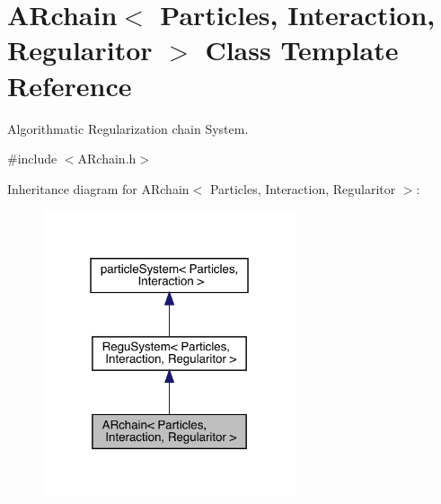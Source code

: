 \hypertarget{class_a_rchain}{}\section{A\+Rchain$<$ Particles, Interaction, Regularitor $>$ Class Template Reference}
\label{class_a_rchain}


Algorithmatic Regularization chain System.  




{\ttfamily \#include $<$A\+Rchain.\+h$>$}



Inheritance diagram for A\+Rchain$<$ Particles, Interaction, Regularitor $>$\+:\nopagebreak
\begin{figure}[H]
\begin{center}
\leavevmode
\includegraphics[width=211pt]{class_a_rchain__inherit__graph}
\end{center}
\end{figure}


